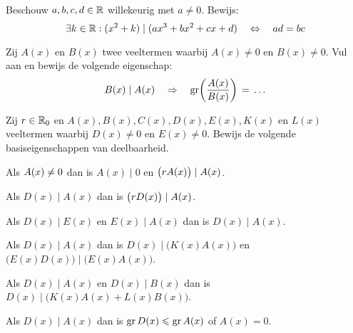 \documentclass{ximera}
\begin{document}
	\author{Koen De Naeghel - Wiskunde Op Maat}
    \xmsource
	\label{xim:veeltermen_deling_door_veelterm_oefeningen_reeks3}



\begin{exercise}
Beschouw $a,b,c,d \in \mathbb{R}$ willekeurig met $a \neq 0$. Bewijs:
\[
\exists k \in \mathbb{R}: (x^2 + k) \mid (ax^3 + bx^2 + cx + d) \quad \Leftrightarrow \quad ad = bc
\]
\end{exercise}

\begin{exercise} 
Zij $A(x)$ en $B(x)$ twee veeltermen waarbij $A(x) \neq 0$ en $B(x) \neq 0$. Vul aan en bewijs de volgende eigenschap:
\[
B(x) \mid A(x) \quad \Rightarrow \quad \operatorname{gr}\biggl(\frac{A(x)}{B(x)}\biggr) 
\, = \, \ldots
\]
\end{exercise}

\begin{exercise}
Zij $r \in \mathbb{R}_0$ en $A(x), B(x), C(x), D(x), E(x), K(x)$ en $L(x)$ veeltermen waarbij $D(x) \neq 0$ en $E(x) \neq 0$. Bewijs de volgende basiseigenschappen van deelbaarheid. 


	\begin{question} Als $\displaystyle A(x)  \neq 0$ dan is $A(x) \mid 0$ en $\displaystyle \bigl(rA(x)\bigr) \mid A(x)$.                                   \end{question}
	\begin{question} Als $D(x) \mid A(x)$ dan is $\displaystyle \bigl(rD(x)\bigr) \mid A(x)$.                                                     \end{question}
	\begin{question} Als $D(x) \mid E(x)$ en $E(x) \mid A(x)$ dan is $D(x) \mid A(x)$.                                                 \end{question}
	\begin{question} Als $D(x) \mid A(x)$ dan is $D(x) \mid \bigl(K(x)A(x)\bigr)$ en $\bigl(E(x)D(x)\bigr) \mid \bigl(E(x)A(x)\bigr)$. \end{question}
	\begin{question} Als $D(x) \mid A(x)$ en $D(x) \mid B(x)$ dan is $D(x) \mid \bigl(K(x)A(x)+L(x)B(x)\bigr)$.                        \end{question}
	\begin{question} Als $D(x) \mid A(x)$ dan is $\operatorname{gr} D(x) \leqslant \operatorname{gr} A(x)$ of $A(x) = 0$.                                               \end{question}
	
\end{exercise}
\end{document}
